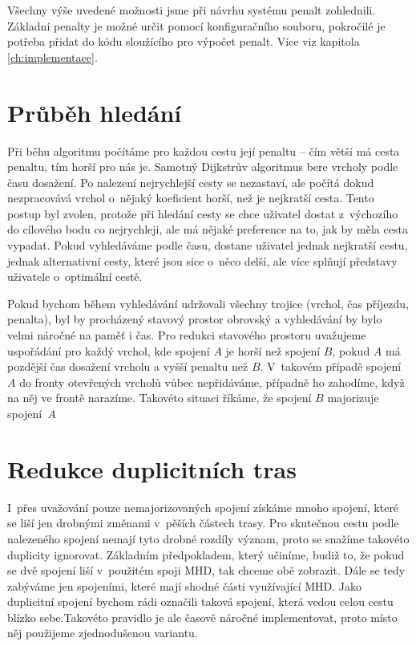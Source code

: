 Všechny výše uvedené možnosti jsme při návrhu systému penalt zohlednili.
Základní penalty je možné určit pomocí konfiguračního souboru, pokročilé je
potřeba přidat do kódu sloužícího pro výpočet penalt. Více viz kapitola
\ref{ch:implementace}.

\section{Průběh hledání}
Při běhu algoritmu počítáme pro každou cestu její penaltu -- čím větší má
cesta penaltu, tím horší pro nás je. Samotný Dijkstrův algoritmus bere vrcholy
podle času dosažení. Po nalezení nejrychlejší cesty se nezastaví, ale počítá
dokud nezpracovává vrchol o~nějaký koeficient horší, než je nejkratší cesta. 
Tento postup byl zvolen, protože při hledání cesty se chce uživatel dostat z~výchozího
do cílového bodu co nejrychleji, ale má nějaké preference na to, jak by měla
cesta vypadat. Pokud vyhledáváme podle času, dostane uživatel jednak nejkratší
cestu, jednak alternativní cesty, které jsou sice o~něco delší, ale více splňují
představy uživatele o~optimální cestě.

Pokud bychom během vyhledávání udržovali všechny trojice (vrchol, čas příjezdu,
penalta), byl by procházený stavový prostor obrovský a vyhledávání by bylo velmi
náročné na paměť i čas. Pro redukci stavového prostoru uvažujeme uspořádání pro
každý vrchol, kde spojení $A$ je horší než spojení $B$, pokud $A$ má pozdější
čas dosažení vrcholu a vyšší penaltu než $B$. V~takovém případě spojení $A$ do
fronty otevřených vrcholů vůbec nepřidáváme, případně ho zahodíme, když na něj
ve frontě narazíme. Takovéto situaci říkáme, že spojení $B$ majorizuje spojení~$A$

\section{Redukce duplicitních tras}
I~přes uvažování pouze nemajorizovaných spojení získáme mnoho spojení, které se
liší jen drobnými změnami v~pěších částech trasy. Pro skutečnou cestu podle
nalezeného spojení nemají tyto drobné rozdíly význam, proto se snažíme takovéto
duplicity ignorovat. Základním předpokladem, který učiníme, budiž to, že pokud
se dvě spojení liší v~použitém spoji MHD, tak chceme obě zobrazit. Dále se tedy
zabýváme jen spojeními, které mají shodné části využívající MHD. Jako duplicitní
spojení bychom rádi označili taková spojení, která vedou celou cestu blízko
sebe.Takovéto pravidlo je ale časově náročné implementovat, proto místo něj použijeme
zjednodušenou variantu.

